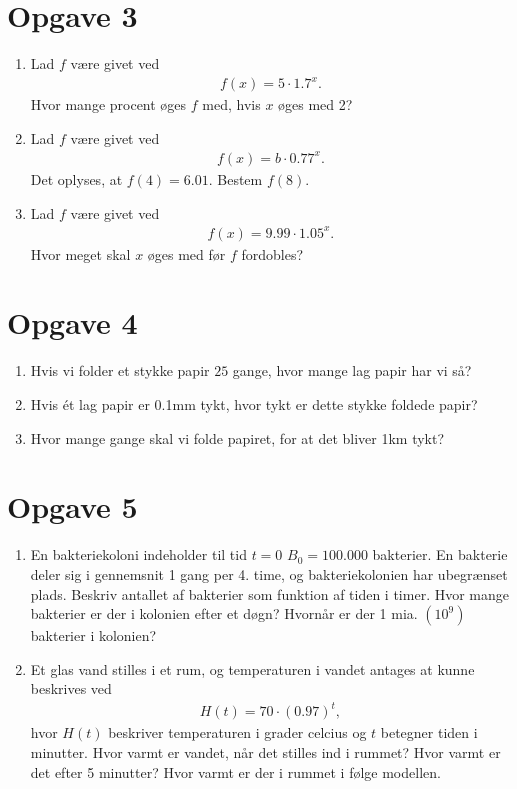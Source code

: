 \documentclass[12pt]{article}
\begin{document}
\section*{Opgave 3}

\begin{enumerate}[label=\roman*)]
	\item Lad $f$ være givet ved
	\begin{align*}
		f(x) = 5\cdot 1.7^x.
	\end{align*}
	Hvor mange procent øges $f$ med, hvis $x$ øges med 2?
	\item Lad $f$ være givet ved
	\begin{align*}
		f(x) = b\cdot 0.77^x.
	\end{align*}
	Det oplyses, at $f(4) = 6.01$. Bestem $f(8)$. 
	\item Lad $f$ være givet ved
	\begin{align*}
		f(x) = 9.99 \cdot 1.05^x.
	\end{align*}
	Hvor meget skal $x$ øges med før $f$ fordobles?
\end{enumerate}


\section*{Opgave 4}
\begin{enumerate}[label=\roman*)]
	\item Hvis vi folder et stykke papir $25$ gange, hvor mange lag papir har vi så?
 	\item Hvis ét lag papir er 0.1mm tykt, hvor tykt er dette stykke foldede papir?
	\item Hvor mange gange skal vi folde papiret, for at det bliver 1km tykt?
\end{enumerate}
\section*{Opgave 5}
\begin{enumerate}[label=\roman*)]
\item En bakteriekoloni indeholder til tid $t=0$ $B_0 = 100.000$ bakterier. En bakterie deler sig i gennemsnit 1 gang per 4. time, og bakteriekolonien har ubegrænset plads. Beskriv antallet af bakterier som funktion af tiden i timer. Hvor mange bakterier er der i kolonien efter et døgn? Hvornår er der 1 mia. $(10^9)$ bakterier i kolonien?
\item Et glas vand stilles i et rum, og temperaturen i vandet antages at kunne beskrives ved
\begin{align*}
H(t) = 70\cdot(0.97)^t,
\end{align*}
hvor $H(t)$ beskriver temperaturen i grader celcius og $t$ betegner tiden i minutter. Hvor varmt er vandet, når det stilles ind i rummet? Hvor varmt er det efter 5 minutter? Hvor varmt er der i rummet i følge modellen. 
\end{enumerate}
\end{document}
